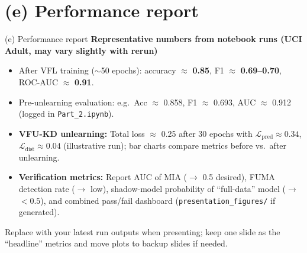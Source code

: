 \documentclass[11pt,aspectratio=169]{beamer}
\begin{document}
\section*{(e) Performance report}
\begin{frame}{(e) Performance report}
  \textbf{Representative numbers from notebook runs (UCI Adult, may vary slightly with rerun)}
  \begin{itemize}
    \item After VFL training ($\sim$50 epochs): accuracy $\approx$ \textbf{0.85}, F1 $\approx$ \textbf{0.69--0.70}, ROC-AUC $\approx$ \textbf{0.91}.
    \item Pre-unlearning evaluation: e.g.\ Acc $\approx$ 0.858, F1 $\approx$ 0.693, AUC $\approx$ 0.912 (logged in \texttt{Part\_2.ipynb}).
    \item \textbf{VFU-KD unlearning:} Total loss $\approx$ 0.25 after 30 epochs with $\mathcal{L}_{\text{pred}}\approx 0.34$, $\mathcal{L}_{\text{dist}}\approx 0.04$ (illustrative run); bar charts compare metrics before vs.\ after unlearning.
    \item \textbf{Verification metrics:} Report AUC of MIA ($\to$ 0.5 desired), FUMA detection rate ($\to$ low), shadow-model probability of ``full-data'' model ($\to$ $<0.5$), and combined pass/fail dashboard (\texttt{presentation\_figures/} if generated).
  \end{itemize}
  \vspace{0.3em}
  \footnotesize Replace with your latest run outputs when presenting; keep one slide as the ``headline'' metrics and move plots to backup slides if needed.
\end{frame}

\end{document}
